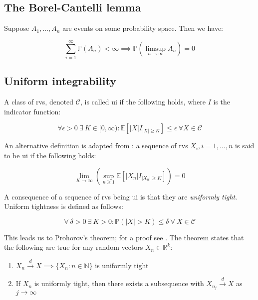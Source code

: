 \documentclass{report}
\begin{document}
\subsection{The Borel-Cantelli lemma}

Suppose $A_1, \dots, A_n$ are events on some probability space. Then we have:

\begin{equation}\label{eq:lst-borel-cantelli}
    \sum_{i=1}^\infty \mathbb{P}(A_n) < \infty \implies \mathbb{P}\left(\limsup_{n\to\infty} A_n\right) = 0
\end{equation}

\subsection{Uniform integrability}

A class of \glspl{rv}, denoted $\mathcal{C}$, is called \gls{ui} if the following holds, where $I$ is the indicator function:

\begin{equation}\label{eq:lst-uniformly-integrable-1}
    \forall \epsilon > 0 \: \exists \: K \in [0, \infty) \colon \mathbb{E}\left[|X| I_{|X|\geq K}\right] \leq \epsilon \: \forall X \in \mathcal{C}
\end{equation}

An alternative definition is adapted from \cite{hu_note_2017}: a sequence of \glspl{rv} $X_i, i = 1, \dots, n$ is said to be \gls{ui} if the following holds:

\begin{equation}\label{eq:lst-uniformly-integrable-2}
    \lim_{K\to\infty}\left(\sup_{n\geq 1}\mathbb{E}\left[|X_n|I_{|X_n| \geq K}\right]\right) = 0
\end{equation}

A consequence of a sequence of \glspl{rv} being \gls{ui} is that they are \textit{uniformly tight}. Uniform tightness is defined as follows:

\begin{equation}\label{eq:lst-tightness}
    \forall \: \delta > 0 \: \exists \: K > 0 \colon \mathbb{P}(|X| > K) \leq \delta \: \forall \: X \in \mathcal{C}
\end{equation}

This leads us to Prohorov's theorem; for a proof see \cite[Chapter~2.1]{van_der_vaart_asymptotic_1998}. The theorem states that the following are true for any random vectors $X_n \in \mathbb{R}^k$:

\begin{enumerate}
    \item $X_n \overset{d}{\to} X \implies \{X_n \colon n \in \mathbb{N}\}$ is uniformly tight
    \item If $X_n$ is uniformly tight, then there exists a subsequence with $X_{n_j} \overset{d}{\to} X$ as $j \to \infty$
\end{enumerate}
\end{document}
